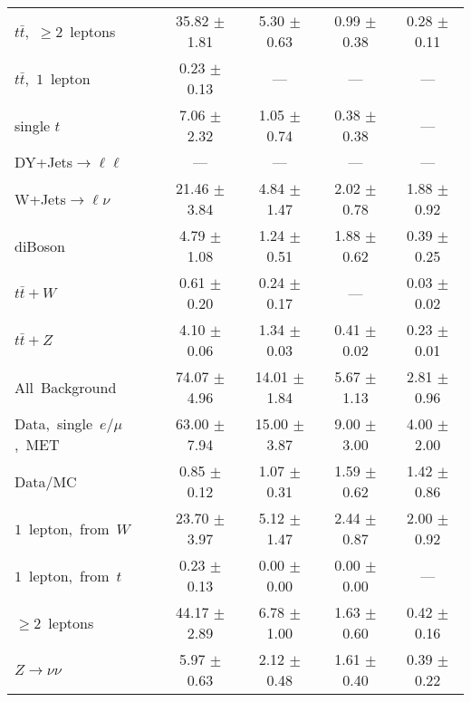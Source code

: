 \documentclass{article}
\begin{document}
\begin{longtable}{|l|c|c|c|c|}
$t\bar{t}$,~$\ge2$~leptons & 35.82 $\pm$ 1.81  & 5.30 $\pm$ 0.63  & 0.99 $\pm$ 0.38  & 0.28 $\pm$ 0.11 \\* 
$t\bar{t}$,~$1$~lepton & 0.23 $\pm$ 0.13  & ---  & ---  & --- \\* 
single $t$  & 7.06 $\pm$ 2.32  & 1.05 $\pm$ 0.74  & 0.38 $\pm$ 0.38  & --- \\* 
DY+Jets$\rightarrow\ell\ell$  & ---  & ---  & ---  & --- \\* 
W+Jets$\rightarrow\ell\nu$  & 21.46 $\pm$ 3.84  & 4.84 $\pm$ 1.47  & 2.02 $\pm$ 0.78  & 1.88 $\pm$ 0.92 \\* 
diBoson  & 4.79 $\pm$ 1.08  & 1.24 $\pm$ 0.51  & 1.88 $\pm$ 0.62  & 0.39 $\pm$ 0.25 \\* 
$t\bar{t}+W$  & 0.61 $\pm$ 0.20  & 0.24 $\pm$ 0.17  & ---  & 0.03 $\pm$ 0.02 \\* 
$t\bar{t}+Z$  & 4.10 $\pm$ 0.06  & 1.34 $\pm$ 0.03  & 0.41 $\pm$ 0.02  & 0.23 $\pm$ 0.01 \\* 
\hline \hline 
All~Background  & 74.07 $\pm$ 4.96  & 14.01 $\pm$ 1.84  & 5.67 $\pm$ 1.13  & 2.81 $\pm$ 0.96 \\* 
Data,~single~$e/\mu$,~MET  & 63.00 $\pm$ 7.94  & 15.00 $\pm$ 3.87  & 9.00 $\pm$ 3.00  & 4.00 $\pm$ 2.00 \\* 
Data/MC  & 0.85 $\pm$ 0.12  & 1.07 $\pm$ 0.31  & 1.59 $\pm$ 0.62  & 1.42 $\pm$ 0.86 \\* 
\hline \hline 
$1$~lepton,~from~$W$  & 23.70 $\pm$ 3.97  & 5.12 $\pm$ 1.47  & 2.44 $\pm$ 0.87  & 2.00 $\pm$ 0.92 \\* 
$1$~lepton,~from~$t$  & 0.23 $\pm$ 0.13  & 0.00 $\pm$ 0.00  & 0.00 $\pm$ 0.00  & --- \\* 
$\ge2$~leptons  & 44.17 $\pm$ 2.89  & 6.78 $\pm$ 1.00  & 1.63 $\pm$ 0.60  & 0.42 $\pm$ 0.16 \\* 
$Z\rightarrow\nu\nu$  & 5.97 $\pm$ 0.63  & 2.12 $\pm$ 0.48  & 1.61 $\pm$ 0.40  & 0.39 $\pm$ 0.22 \\* 
\hline 
\end{longtable} 

 
 
 
 
\pagebreak 

 
 
 
 
\end{document}
